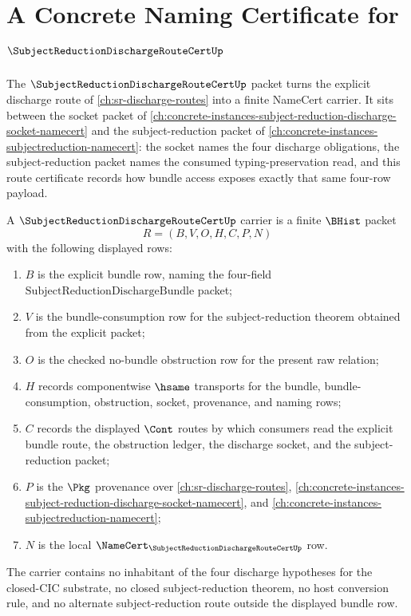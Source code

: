 \chapter{A Concrete Naming Certificate for $\SubjectReductionDischargeRouteCertUp$}
\label{ch:concrete-instances-subjectreductiondischargeroutecert-namecert}

The $\SubjectReductionDischargeRouteCertUp$ packet turns the explicit discharge route of \autoref{ch:sr-discharge-routes} into a finite NameCert carrier. It sits between the socket packet of \autoref{ch:concrete-instances-subject-reduction-discharge-socket-namecert} and the subject-reduction packet of \autoref{ch:concrete-instances-subjectreduction-namecert}: the socket names the four discharge obligations, the subject-reduction packet names the consumed typing-preservation read, and this route certificate records how bundle access exposes exactly that same four-row payload.

\begin{definition}
\label{def:subject-reduction-discharge-route-cert-carrier}
A $\SubjectReductionDischargeRouteCertUp$ carrier is a finite $\BHist$ packet
$$
R=(B,V,O,H,C,P,N)
$$
with the following displayed rows:
\begin{enumerate}
\item $B$ is the explicit bundle row, naming the four-field $\mathrm{SubjectReductionDischargeBundle}$ packet;
\item $V$ is the bundle-consumption row for the subject-reduction theorem obtained from the explicit packet;
\item $O$ is the checked no-bundle obstruction row for the present raw relation;
\item $H$ records componentwise $\hsame$ transports for the bundle, bundle-consumption, obstruction, socket, provenance, and naming rows;
\item $C$ records the displayed $\Cont$ routes by which consumers read the explicit bundle route, the obstruction ledger, the discharge socket, and the subject-reduction packet;
\item $P$ is the $\Pkg$ provenance over \autoref{ch:sr-discharge-routes}, \autoref{ch:concrete-instances-subject-reduction-discharge-socket-namecert}, and \autoref{ch:concrete-instances-subjectreduction-namecert};
\item $N$ is the local $\NameCert_{\SubjectReductionDischargeRouteCertUp}$ row.
\end{enumerate}
The carrier contains no inhabitant of the four discharge hypotheses for the closed-CIC substrate, no closed subject-reduction theorem, no host conversion rule, and no alternate subject-reduction route outside the displayed bundle row.
\end{definition}

